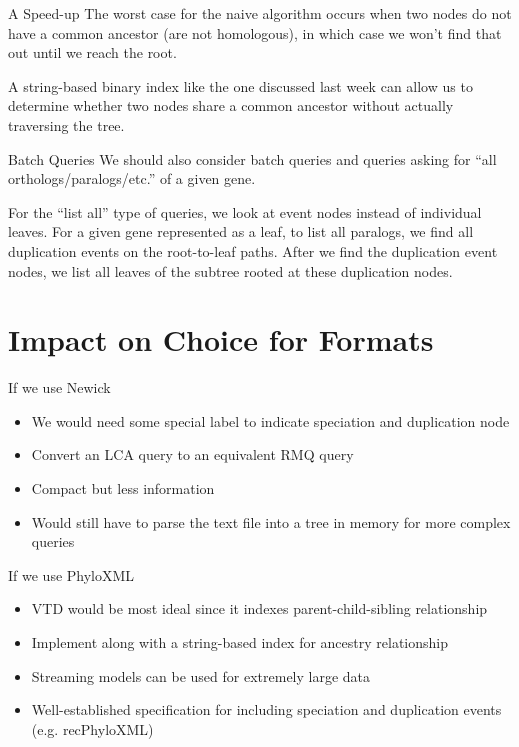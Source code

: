 \documentclass{beamer}
\begin{document}
\begin{frame}{A Speed-up}
    The worst case for the naive algorithm occurs when two nodes do not have a common ancestor (are not homologous), in which case we won't find that out until we reach the root.

    A string-based binary index like the one discussed last week can allow us to determine whether two nodes share a common ancestor without actually traversing the tree.
\end{frame}

\begin{frame}{Batch Queries}
    We should also consider batch queries and queries asking for ``all orthologs/paralogs/etc.'' of a given gene.

    For the ``list all'' type of queries, we look at event nodes instead of individual leaves. For a given gene represented as a leaf, to list all paralogs, we find all duplication events on the root-to-leaf paths. After we find the duplication event nodes, we list all leaves of the subtree rooted at these duplication nodes.
\end{frame}

\section{Impact on Choice for Formats}

\begin{frame}{If we use Newick}
    \begin{itemize}
        \item We would need some special label to indicate speciation and duplication node
        \item Convert an LCA query to an equivalent RMQ query
        \item Compact but less information
        \item Would still have to parse the text file into a tree in memory for more complex queries
    \end{itemize}
\end{frame}

\begin{frame}{If we use PhyloXML}
    \begin{itemize}
        \item VTD would be most ideal since it indexes parent-child-sibling relationship
        \item Implement along with a string-based index for ancestry relationship
        \item Streaming models can be used for extremely large data
        \item Well-established specification for including speciation and duplication events (e.g. recPhyloXML)
    \end{itemize}
\end{frame}
\end{document}

